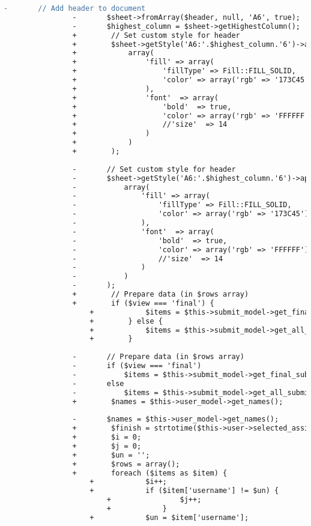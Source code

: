 \begin{lstlisting}[language=diff, caption=Perubahan pada kode Submissions.php]
				-		// Add header to document
				-		$sheet->fromArray($header, null, 'A6', true);
				-		$highest_column = $sheet->getHighestColumn();
				+        // Set custom style for header
				+        $sheet->getStyle('A6:'.$highest_column.'6')->applyFromArray(
				+            array(
				+                'fill' => array(
				+                    'fillType' => Fill::FILL_SOLID,
				+                    'color' => array('rgb' => '173C45')
				+                ),
				+                'font'  => array(
				+                    'bold'  => true,
				+                    'color' => array('rgb' => 'FFFFFF'),
				+                    //'size'  => 14
				+                )
				+            )
				+        );
				
				-		// Set custom style for header
				-		$sheet->getStyle('A6:'.$highest_column.'6')->applyFromArray(
				-			array(
				-				'fill' => array(
				-					'fillType' => Fill::FILL_SOLID,
				-					'color' => array('rgb' => '173C45')
				-				),
				-				'font'  => array(
				-					'bold'  => true,
				-					'color' => array('rgb' => 'FFFFFF'),
				-					//'size'  => 14
				-				)
				-			)
				-		);
				+        // Prepare data (in $rows array)
				+        if ($view === 'final') {
					+            $items = $this->submit_model->get_final_submissions($this->user->selected_assignment['id'], $this->user->level, $this->user->username, null, $this->filter_user, $this->filter_problem);
					+        } else {
					+            $items = $this->submit_model->get_all_submissions($this->user->selected_assignment['id'], $this->user->level, $this->user->username, null, $this->filter_user, $this->filter_problem);
					+        }
				
				-		// Prepare data (in $rows array)
				-		if ($view === 'final')
				-			$items = $this->submit_model->get_final_submissions($this->user->selected_assignment['id'], $this->user->level, $this->user->username, NULL, $this->filter_user, $this->filter_problem);
				-		else
				-			$items = $this->submit_model->get_all_submissions($this->user->selected_assignment['id'], $this->user->level, $this->user->username, NULL, $this->filter_user, $this->filter_problem);
				+        $names = $this->user_model->get_names();
				
				-		$names = $this->user_model->get_names();
				+        $finish = strtotime($this->user->selected_assignment['finish_time']);
				+        $i = 0;
				+        $j = 0;
				+        $un = '';
				+        $rows = array();
				+        foreach ($items as $item) {
					+            $i++;
					+            if ($item['username'] != $un) {
						+                $j++;
						+            }
					+            $un = $item['username'];
					

\end{lstlisting}
